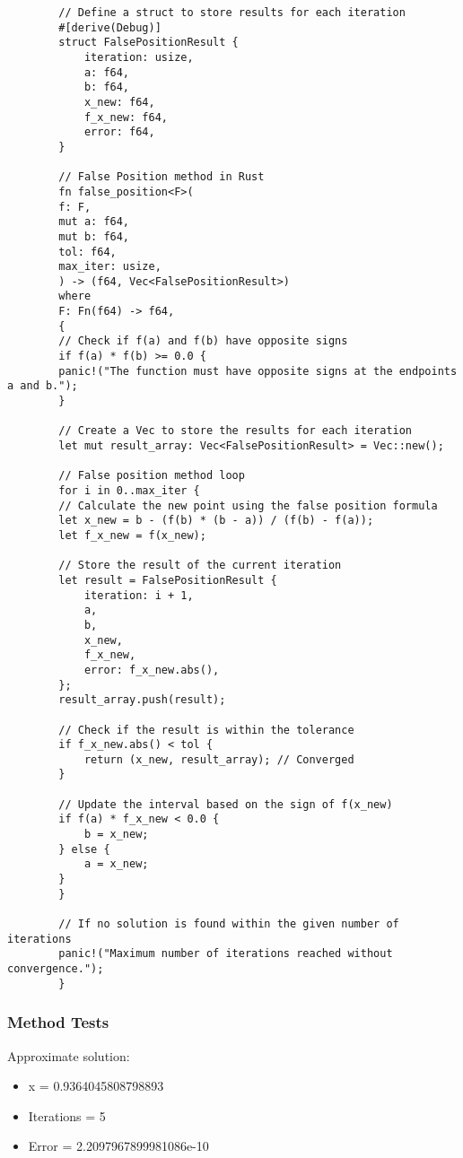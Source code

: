 \documentclass{article}
\begin{document}
    \begin{verbatim}
        // Define a struct to store results for each iteration
        #[derive(Debug)]
        struct FalsePositionResult {
            iteration: usize,
            a: f64,
            b: f64,
            x_new: f64,
            f_x_new: f64,
            error: f64,
        }

        // False Position method in Rust
        fn false_position<F>(
        f: F,
        mut a: f64,
        mut b: f64,
        tol: f64,
        max_iter: usize,
        ) -> (f64, Vec<FalsePositionResult>)
        where
        F: Fn(f64) -> f64,
        {
        // Check if f(a) and f(b) have opposite signs
        if f(a) * f(b) >= 0.0 {
        panic!("The function must have opposite signs at the endpoints a and b.");
        }

        // Create a Vec to store the results for each iteration
        let mut result_array: Vec<FalsePositionResult> = Vec::new();

        // False position method loop
        for i in 0..max_iter {
        // Calculate the new point using the false position formula
        let x_new = b - (f(b) * (b - a)) / (f(b) - f(a));
        let f_x_new = f(x_new);

        // Store the result of the current iteration
        let result = FalsePositionResult {
            iteration: i + 1,
            a,
            b,
            x_new,
            f_x_new,
            error: f_x_new.abs(),
        };
        result_array.push(result);

        // Check if the result is within the tolerance
        if f_x_new.abs() < tol {
            return (x_new, result_array); // Converged
        }

        // Update the interval based on the sign of f(x_new)
        if f(a) * f_x_new < 0.0 {
            b = x_new;
        } else {
            a = x_new;
        }
        }

        // If no solution is found within the given number of iterations
        panic!("Maximum number of iterations reached without convergence.");
        }
     \end{verbatim}
    \subsubsection{Method Tests}

        Approximate solution:
            \begin{itemize}
                \item x = 0.9364045808798893
                \item Iterations = 5
                \item Error = 2.2097967899981086e-10
            \end{itemize}
\end{document}
